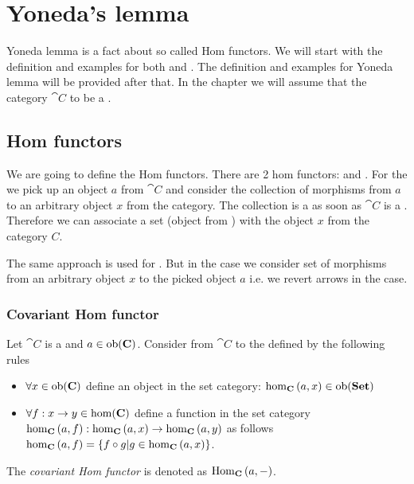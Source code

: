 \chapter{Yoneda's lemma}
\label{sec:yoneda}
Yoneda lemma is a fact about so called Hom functors. We will start
with the definition and examples for both
 and . The
definition and examples for Yoneda lemma will be provided after that. 
In the chapter we will assume that the category $\cat{C}$ to be a
.

\section{Hom functors}

We are going to define the Hom functors. There are 2 hom functors:
 and
. For the
 we pick up an object $a$ from 
$\cat{C}$ and consider the collection of morphisms from $a$ to an
arbitrary object $x$ from the category. The collection is a
 as soon as $\cat{C}$ is a
. Therefore we can associate a
set (object from ) with the object $x$ from the
category $C$. 

The same approach is used for 
. But in the case we consider set of
morphisms from an arbitrary object $x$ to the picked object $a$ i.e.
we revert arrows in the case.

\subsection{Covariant Hom functor}
\begin{definition}
\label{def:cov_hom_functor}
Let $\cat{C}$ is a  and $a \in
\mathrm{ob}(\mathbf{C})$. Consider  from $\cat{C}$ to the
 defined by the following rules
\begin{itemize}
\item $\forall x \in \mathrm{ob}(\mathbf{C})$ define an object in the set category:
  $\catmset[C]{a}{x} \in \catob{Set}$ 
\item $\forall f: x \to y \in \mathrm{hom}(\mathbf{C})$ define a function in the set category
  $\catmset[C]{a}{f}: \catmset[C]{a}{x} \to \catmset[C]{a}{y}$ as follows
  $\catmset[C]{a}{f} = \{f \circ g | g \in \catmset[C]{a}{x}\}$.
\end{itemize}  
The \textit{covariant Hom functor} is denoted as $\mathrm{Hom}_{\mathbf{C}}\left(a, -\right)$.
\end{definition}


